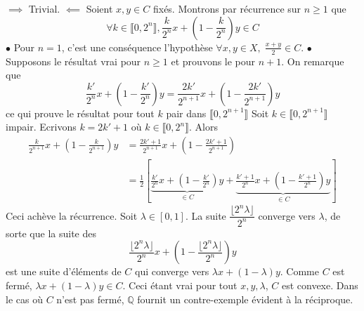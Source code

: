 \documentclass{report}
\begin{document}
\subsection{} \noindent{}\\ 
\\ 
\\
\noindent $\implies$ Trivial. \newline
$\impliedby$ Soient $x,y\in C$ fixés. Montrons par récurrence sur $n\geq 1$ que $$\forall k \in \llbracket 0,2^n \rrbracket,\frac{k}{2^n}x+ \left( 1-\frac{k}{2^n} \right)y\in C$$\newline \newline 
$\bullet$ Pour $n=1$, c'est une conséquence l'hypothèse $\forall x,y \in X, \; \frac{x+y}{2} \in C $. \newline
$\bullet$ Supposons le résultat vrai pour $n\geq 1$ et prouvons le pour $n+1$.\newline
On remarque que $$\frac{k'}{2^n}x+ \left( 1-\frac{k'}{2^n} \right)y =  \frac{2k'}{2^{n+1}}x+ \left( 1-\frac{2k'}{2^{n+1}} \right)y$$ ce qui prouve le résultat pour tout $k$ pair dans $\llbracket 0,2^{n+1} \rrbracket$\newline
Soit $k\in \llbracket 0,2^{n+1} \rrbracket$ impair. Ecrivons $k=2k'+1$ où $k\in \llbracket 0,2^n \rrbracket$. Alors
$$ \begin{aligned}
\frac{k}{2^{n+1}}x+ \left( 1-\frac{k}{2^{n+1}} \right)y &= \frac{2k'+1}{2^{n+1}}x+ \left( 1-\frac{2k'+1}{2^{n+1}} \right)\\
&= \frac{1}{2} \left[ \underbrace{\frac{k'}{2^n}x+ \left( 1-\frac{k'}{2^n} \right)y}_{\in C}  + \underbrace{\frac{k'+1}{2^n}x+ \left( 1-\frac{k'+1}{2^n} \right)y}_{\in C} \right]
\end{aligned}$$
Ceci achève la récurrence.\newline \newline
Soit $\lambda \in [0,1]$. La suite $\dfrac{\lfloor 2^n \lambda\rfloor}{2^n}$ converge vers $\lambda$, de sorte que la suite des $$\frac{\lfloor 2^n \lambda\rfloor}{2^n}x + \left(1- \frac{\lfloor 2^n \lambda\rfloor}{2^n}\right)y$$ est une suite d'éléments de $C$ qui converge vers $\lambda x +(1-\lambda)y$. Comme $C$ est fermé, $\lambda x +(1-\lambda)y\in C$. Ceci étant vrai pour tout $x,y,\lambda$, $C$ est convexe.\newline \newline
Dans le cas où $C$ n'est pas fermé, $\mathbb Q$ fournit un contre-exemple évident à la réciproque.
\end{document}
